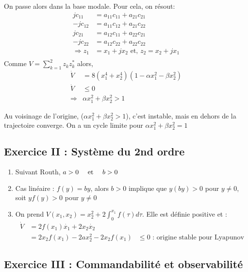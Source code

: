 \documentclass{../../td}{subfiles}
\begin{document}
\begin{enumerate}
On passe alors dans la base modale. Pour cela, on résout:
\begin{align*}
jc_{11} &= a_{11}c_{11} + a_{21}c_{21}\\
-jc_{12} &= a_{11} c_{12} + a_{21}c_{22}\\
jc_{21} &= a_{12} c_{11} + a_{22} c_{21} \\
-jc_{22} &= a_{12}c_{22} + a_{22} c_{22}\\
\Rightarrow z_1 &= x_1 + j x_2 \text{ et, } z_2 = x_2 + jx_1\\
\end{align*}
Comme $V = \sum_{k=1}^2 z_k z_k^*$ alors,
\begin{align*}
\dot{V} &= 8(x_1^4+x_2^4)(1-\alpha x_1^2 - \beta x_2^2)\\
\dot{V} &\leq 0\\
\Rightarrow& \alpha x_1^2 + \beta x_2^2 > 1 
\end{align*}

Au voisinage de l'origine, ($\alpha x_1^2 + \beta x_2^2 >1$), c'est instable, mais en dehors de la trajectoire converge. On a un cycle limite pour $\alpha x_1^2 + \beta x_2^2 =1$
\end{enumerate}

\subsection*{Exercice II : Système du 2nd ordre}

\begin{enumerate}
\item Suivant Routh, $a>0 \quad\text{ et }\quad b>0$
\item Cas linéaire : $f(y)=by$, alors $b>0$ implique que $y(by) >0$ pour $y\neq0$, soit $yf(y)>0$ pour $y\neq 0$
\item On prend $V(x_1,x_2) = x_2^2 + 2 \int_0^{x_1}f(\tau)d\tau$. Elle est définie positive et : \begin{align*}
\dot{V} & = 2f(x_1)\dot{x_1} + 2x_2 \dot{x_2} \\
& = 2 x_2 f(x_1) - 2ax_2^2 -2x_2 f(x_1)
& \leq 0 \text{ : origine stable pour Lyapunov}
\end{align*}
\end{enumerate}

\subsection*{Exercice III : Commandabilité et observabilité}
\newcommand{\D}{\mathcal{D}}
\newcommand{\Vc}{\mathcal{V}}
\end{document}
